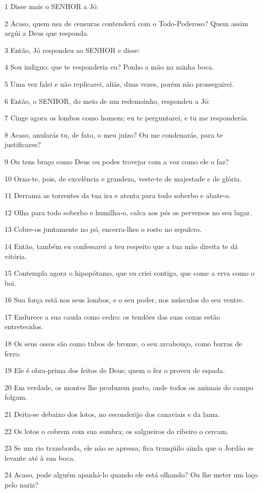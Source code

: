 \par 1 Disse mais o SENHOR a Jó:
\par 2 Acaso, quem usa de censuras contenderá com o Todo-Poderoso? Quem assim argúi a Deus que responda.
\par 3 Então, Jó respondeu ao SENHOR e disse:
\par 4 Sou indigno; que te responderia eu? Ponho a mão na minha boca.
\par 5 Uma vez falei e não replicarei, aliás, duas vezes, porém não prosseguirei.
\par 6 Então, o SENHOR, do meio de um redemoinho, respondeu a Jó:
\par 7 Cinge agora os lombos como homem; eu te perguntarei, e tu me responderás.
\par 8 Acaso, anularás tu, de fato, o meu juízo? Ou me condenarás, para te justificares?
\par 9 Ou tens braço como Deus ou podes trovejar com a voz como ele o faz?
\par 10 Orna-te, pois, de excelência e grandeza, veste-te de majestade e de glória.
\par 11 Derrama as torrentes da tua ira e atenta para todo soberbo e abate-o.
\par 12 Olha para todo soberbo e humilha-o, calca aos pés os perversos no seu lugar.
\par 13 Cobre-os juntamente no pó, encerra-lhes o rosto no sepulcro.
\par 14 Então, também eu confessarei a teu respeito que a tua mão direita te dá vitória.
\par 15 Contempla agora o hipopótamo, que eu criei contigo, que come a erva como o boi.
\par 16 Sua força está nos seus lombos, e o seu poder, nos músculos do seu ventre.
\par 17 Endurece a sua cauda como cedro; os tendões das suas coxas estão entretecidos.
\par 18 Os seus ossos são como tubos de bronze, o seu arcabouço, como barras de ferro.
\par 19 Ele é obra-prima dos feitos de Deus; quem o fez o proveu de espada.
\par 20 Em verdade, os montes lhe produzem pasto, onde todos os animais do campo folgam.
\par 21 Deita-se debaixo dos lotos, no esconderijo dos canaviais e da lama.
\par 22 Os lotos o cobrem com sua sombra; os salgueiros do ribeiro o cercam.
\par 23 Se um rio transborda, ele não se apressa; fica tranqüilo ainda que o Jordão se levante até à sua boca.
\par 24 Acaso, pode alguém apanhá-lo quando ele está olhando? Ou lhe meter um laço pelo nariz?

